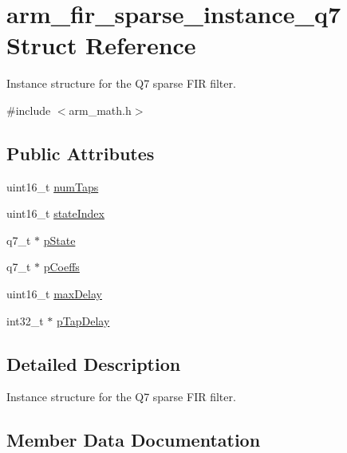 \hypertarget{structarm__fir__sparse__instance__q7}{}\section{arm\+\_\+fir\+\_\+sparse\+\_\+instance\+\_\+q7 Struct Reference}
\label{structarm__fir__sparse__instance__q7}


Instance structure for the Q7 sparse F\+IR filter.  




{\ttfamily \#include $<$arm\+\_\+math.\+h$>$}

\subsection*{Public Attributes}
\begin{DoxyCompactItemize}
\item 
uint16\+\_\+t \hyperlink{structarm__fir__sparse__instance__q7_a54cdd27ca1c672b126c38763ce678b1c}{num\+Taps}
\item 
uint16\+\_\+t \hyperlink{structarm__fir__sparse__instance__q7_a2d2e65473fe3a3f2b953b4e0b60824df}{state\+Index}
\item 
q7\+\_\+t $\ast$ \hyperlink{structarm__fir__sparse__instance__q7_a18072cf3ef3666d588f0d49512f2b28f}{p\+State}
\item 
q7\+\_\+t $\ast$ \hyperlink{structarm__fir__sparse__instance__q7_a3dac86f15e33553e8f3e19e0d712bae5}{p\+Coeffs}
\item 
uint16\+\_\+t \hyperlink{structarm__fir__sparse__instance__q7_af74dacc1d34c078283e50f2530eb91df}{max\+Delay}
\item 
int32\+\_\+t $\ast$ \hyperlink{structarm__fir__sparse__instance__q7_ac625393c84bc0342ffdf26fc4eba1ac1}{p\+Tap\+Delay}
\end{DoxyCompactItemize}


\subsection{Detailed Description}
Instance structure for the Q7 sparse F\+IR filter. 

\subsection{Member Data Documentation}
